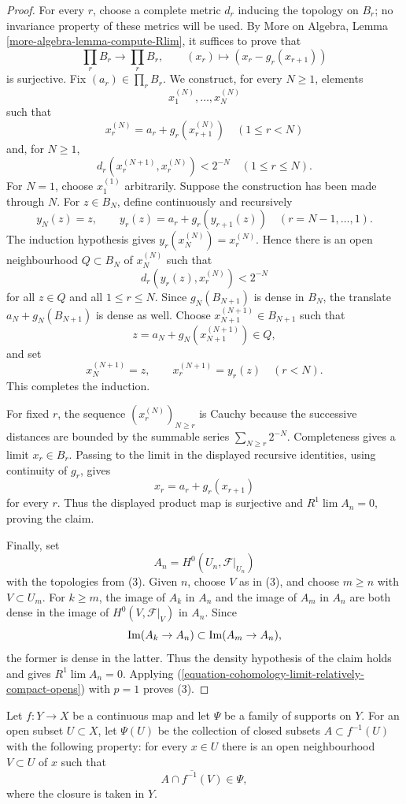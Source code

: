 \begin{proof}
For every $r$, choose a complete metric $d_r$ inducing the topology
on $B_r$; no invariance property of these metrics will be used.
By More on Algebra, Lemma \ref{more-algebra-lemma-compute-Rlim}, it
suffices to prove that
$$
\prod_r B_r\longrightarrow\prod_r B_r,\qquad
(x_r)\longmapsto(x_r-g_r(x_{r+1}))
$$
is surjective. Fix $(a_r)\in\prod_rB_r$. We construct, for every
$N\geq1$, elements
$$
x_1^{(N)},\ldots,x_N^{(N)}
$$
such that
$$
x_r^{(N)}=a_r+g_r(x_{r+1}^{(N)})\quad(1\leq r<N)
$$
and, for $N\geq1$,
$$
d_r(x_r^{(N+1)},x_r^{(N)})<2^{-N}
\quad(1\leq r\leq N).
$$
For $N=1$, choose $x_1^{(1)}$ arbitrarily. Suppose the construction
has been made through $N$. For $z\in B_N$, define continuously and
recursively
$$
y_N(z)=z,\qquad
y_r(z)=a_r+g_r(y_{r+1}(z))\quad(r=N-1,\ldots,1).
$$
The induction hypothesis gives
$y_r(x_N^{(N)})=x_r^{(N)}$. Hence there is an open neighbourhood
$Q\subset B_N$ of $x_N^{(N)}$ such that
$$
d_r(y_r(z),x_r^{(N)})<2^{-N}
$$
for all $z\in Q$ and all $1\leq r\leq N$. Since $g_N(B_{N+1})$ is
dense in $B_N$, the translate $a_N+g_N(B_{N+1})$ is dense as well.
Choose $x_{N+1}^{(N+1)}\in B_{N+1}$ such that
$$
z=a_N+g_N(x_{N+1}^{(N+1)})\in Q,
$$
and set
$$
x_N^{(N+1)}=z,\qquad
x_r^{(N+1)}=y_r(z)\quad(r<N).
$$
This completes the induction.

For fixed $r$, the sequence $(x_r^{(N)})_{N\geq r}$ is Cauchy because
the successive distances are bounded by the summable series
$\sum_{N\geq r}2^{-N}$. Completeness gives a limit $x_r\in B_r$.
Passing to the limit in the displayed recursive identities, using
continuity of $g_r$, gives
$$
x_r=a_r+g_r(x_{r+1})
$$
for every $r$. Thus the displayed product map is surjective and
$R^1\lim A_n=0$, proving the claim.

Finally, set
$$
A_n=H^0(U_n,\mathcal{F}|_{U_n})
$$
with the topologies from (3). Given $n$, choose $V$ as in (3), and
choose $m\geq n$ with $V\subset U_m$. For $k\geq m$, the image of
$A_k$ in $A_n$ and the image of $A_m$ in $A_n$ are both dense in the
image of $H^0(V,\mathcal{F}|_V)$ in $A_n$. Since
$$
\mathop{\rm Im}(A_k\to A_n)
\subset
\mathop{\rm Im}(A_m\to A_n),
$$
the former is dense in the latter. Thus the density hypothesis of the
claim holds and gives $R^1\lim A_n=0$. Applying
(\ref{equation-cohomology-limit-relatively-compact-opens}) with $p=1$
proves (3).
\end{proof}


\begin{definition}
\label{definition-relative-family-supports}
\begin{reference}
\cite[Chapter III, \S 3.7, pp. 171--172]{Tohoku}
\end{reference}
Let $f : Y \to X$ be a continuous map and let $\Psi$ be a family of
supports on $Y$. For an open subset $U \subset X$, let $\Psi(U)$ be the
collection of closed subsets $A \subset f^{-1}(U)$ with the following
property: for every $x \in U$ there is an open neighbourhood $V \subset U$
of $x$ such that
$$
\overline{A \cap f^{-1}(V)} \in \Psi,
$$
where the closure is taken in $Y$.
\end{definition}

